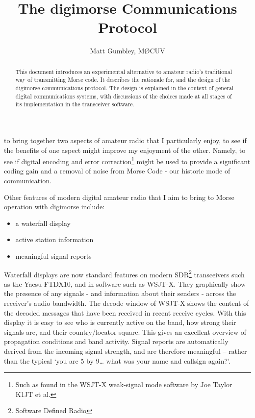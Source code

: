 \documentclass[a4paper]{tufte-handout}
\title{The digimorse Communications Protocol}
\author{ Matt Gumbley, M{\O}CUV}
\begin{document}
    \maketitle %

    \begin{abstract}
        \noindent
        This document introduces an experimental alternative to amateur radio's traditional way of transmitting Morse code.
        It describes the rationale for, and the design of the digimorse communications protocol.
        The design is explained in the context of general digital communications systems, with
        discussions of the choices made at all stages of its implementation in the transceiver software.
    \end{abstract}

     to bring together two aspects of amateur radio that I
    particularly
    enjoy, to see if the benefits of one aspect might improve my enjoyment of the other.
    Namely, to see if digital encoding and error correction\footnote{Such as found in the WSJT-X weak-signal mode
    software by Joe Taylor K1JT et al.} might be used to provide a significant coding gain and a removal of noise
    from Morse Code - our historic mode of communication.

    Other features of modern digital amateur radio that I aim to bring to Morse operation with digimorse include:
    \begin{itemize}
        \setlength\itemsep{-0.5em}
        \item a waterfall display
        \item active station information
        \item meaningful signal reports
    \end{itemize}

    Waterfall displays are now standard features on modern SDR\footnote{Software Defined Radio} transceivers such as
    the Yaesu FTDX10, and in software such as WSJT-X\cite{FT4FT8}.
    They graphically show the presence of any signals - and information about their senders - across the receiver's
    audio bandwidth.
    The decode window of WSJT-X shows the content of the decoded messages that have been received in recent
    receive cycles.
    With this display it is easy to see who is currently active on the band, how strong their signals are, and their
    country/locator square.
    This gives an excellent overview of propagation conditions and band activity.
    Signal reports are automatically derived from the incoming signal strength, and are therefore meaningful – rather
    than the typical ‘you are 5 by 9… what was your name and callsign again?’.
\end{document}
